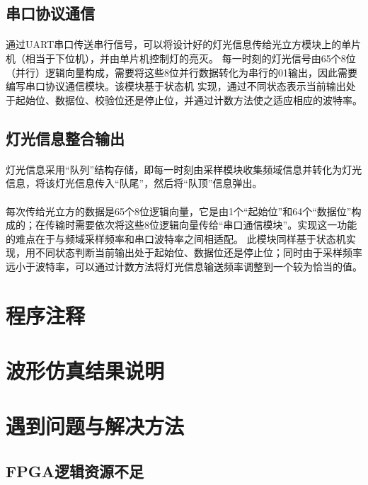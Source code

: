 \documentclass[12pt]{article}
\begin{document}
\subsection{串口协议通信}
\paragraph{}通过UART串口传送串行信号，可以将设计好的灯光信息传给光立方模块上的单片机（相当于下位机），并由单片机控制灯的亮灭。
每一时刻的灯光信号由65个8位（并行）逻辑向量构成，需要将这些8位并行数据转化为串行的01输出，因此需要编写串口协议通信模块。该模块基于状态机
实现，通过不同状态表示当前输出处于起始位、数据位、校验位还是停止位，并通过计数方法使之适应相应的波特率。

\subsection{灯光信息整合输出}
\paragraph{}灯光信息采用“队列”结构存储，即每一时刻由采样模块收集频域信息并转化为灯光信息，将该灯光信息传入“队尾”，然后将“队顶”信息弹出。
\paragraph{}每次传给光立方的数据是65个8位逻辑向量，它是由1个“起始位”和64个“数据位”构成的；在传输时需要依次将这些8位逻辑向量传给“串口通信模块”。实现这一功能的难点在于与频域采样频率和串口波特率之间相适配。
此模块同样基于状态机实现，用不同状态判断当前输出处于起始位、数据位还是停止位；同时由于采样频率远小于波特率，可以通过计数方法将灯光信息输送频率调整到一个较为恰当的值。



\section{程序注释}
\section{波形仿真结果说明}
\section{遇到问题与解决方法}
\subsection{FPGA逻辑资源不足}
\end{document}
